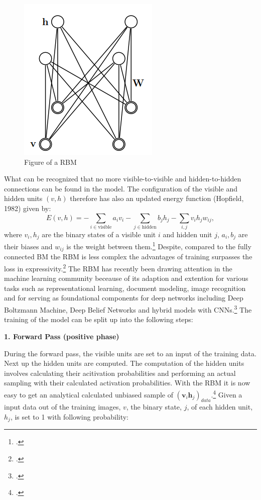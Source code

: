 \begin{figure}[H]
    \centering
    \includegraphics[width=0.25\linewidth]{graphics/RBM_Modell.png}
    \caption{Figure of a \ac{RBM}}
\end{figure}
What can be recognized that no more visible-to-visible and hidden-to-hidden connections can be found in the model.
The configuration of the visible and hidden units \( (v, h) \) therefore has also an updated energy function (Hopfield, 1982) given by:
\begin{equation}
E(v, h) = - \sum_{i \in \text{visible}} a_i v_i - \sum_{j \in \text{hidden}} b_j h_j - \sum_{i,j} v_i h_j w_{ij},
\end{equation}
where \( v_i, h_j \) are the binary states of a visible unit \( i \) and hidden unit \( j \), \( a_i, b_j \) are their biases and \( w_{ij} \) is the weight between them.\footcite[Vgl.][3-4]{hintonPracticalGuideTraining2012a}
Despite, compared to the fully connected \ac{BM} the \ac{RBM} is less complex the advantages of training surpasses the loss in expressivity.\footcite[Vgl.][4]{huembeliPhysicsEnergybasedModels2022}
The \ac{RBM} has recently been drawing attention in the machine learning community beceause of its adaption and extention for various tasks such as representational learning, document modeling, image recognition and for
serving as foundational components for deep networks including Deep Boltzmann Machine, Deep Belief Networks and hybrid models with CNNs.\footcite[Vgl.][1186]{zhangOverviewRestrictedBoltzmann2018}
The training of the model can be split up into the following steps:

\textbf{1. Forward Pass (positive phase)}

During the forward pass, the visible units are set to an input of the training data. Next up the hidden units are computed.
The computation of the hidden units involves calculating their acitivation probabilities and performing an actual sampling with their calculated activation probabilities.
With the \ac{RBM} it is now easy to get an analytical calculated unbiased sample of $(\textbf{v}_i\textbf{h}_j)_{data}$.\footcite[Vgl.][5]{hintonPracticalGuideTraining2012}
Given a input data out of the training images, \( v \), the binary state, \( j \), of each hidden unit,  \( h_j \), is set to 1 with following probability:

